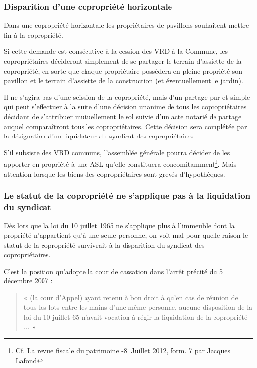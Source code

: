 		\subsubsection{Disparition d’une copropriété horizontale}
	
			Dans une copropriété horizontale les propriétaires de pavillons souhaitent mettre fin à la copropriété.
		
			Si cette demande est consécutive à la cession des VRD à la Commune, les copropriétaires décideront simplement de se partager le terrain d’assiette de la copropriété, en sorte que chaque propriétaire
			possèdera en pleine propriété son pavillon et le terrain d’assiette de la construction (et éventuellement le jardin).
			
			Il ne s’agira pas d’une scission de la copropriété, mais d’un partage pur et simple qui peut s’effectuer à la suite d’une décision unanime de tous les copropriétaires décidant de s’attribuer mutuellement le sol suivie d’un acte notarié de partage auquel comparaîtront tous les copropriétaires. Cette décision sera complétée par la désignation d’un liquidateur du syndicat des copropriétaires.
			
			S’il subsiste des VRD communs, l’assemblée générale pourra décider de les apporter en propriété à une ASL qu’elle constituera concomitamment\footnote{Cf. La revue fiscale du patrimoine -8, Juillet 2012, form. 7 par Jacques Lafond}. Mais attention lorsque les biens des copropriétaires sont grevés d’hypothèques.
	
		\subsubsection{Le statut de la copropriété ne s’applique pas à la liquidation du syndicat}
		
			Dès lors que la loi du 10 juillet 1965 ne s’applique plus à l’immeuble dont la propriété n’appartient qu’à une seule personne, on voit mal pour quelle raison le statut de la copropriété survivrait à la disparition du syndicat des copropriétaires.
			
			C’est la position qu’adopte la cour de cassation dans l’arrêt précité du 5 décembre 2007 :
			\begin{quote}
				« (la cour d’Appel) ayant retenu à bon droit à qu’en cas de réunion de tous les lots entre les mains d’une même personne, aucune disposition de la loi du 10 juillet 65 n’avait vocation à régir la liquidation de la copropriété $\dots$ »
			\end{quote}
			
